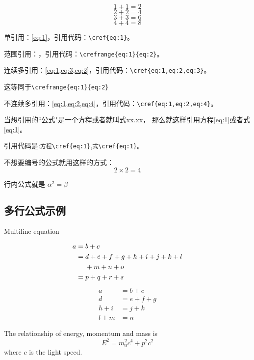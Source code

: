 \begin{equation}
1+1=2 \label{eq:1}
\end{equation}
\begin{equation}
2+2=4 \label{eq:2}
\end{equation}
\begin{equation}
3+3=6 \label{eq:3}
\end{equation}
\begin{equation}
4+4=8 \label{eq:4}
\end{equation}

单引用：\cref{eq:1}，引用代码：\verb|\cref{eq:1}|。

范围引用：，引用代码：\verb|\crefrange{eq:1}{eq:2}|。

连续多引用：\cref{eq:1,eq:3,eq:2}，引用代码：\verb|\cref{eq:1,eq:2,eq:3}|。

这等同于\verb|\crefrange{eq:1}{eq:2}|

不连续多引用：\cref{eq:1,eq:2,eq:4}，引用代码：\verb|\cref{eq:1,eq:2,eq:4}|。



当想引用的``公式"是一个方程或者就叫式xx.xx，
那么就这样引用方程\cref{eq:1}或者式\cref{eq:1}。

引用代码是:\verb|方程\cref{eq:1}|,\verb|式\cref{eq:1}|。

不想要编号的公式就用这样的方式：
 \[ 2\times 2=4 \]

 行内公式就是  $ \alpha ^2= \beta $

\subsection{多行公式示例}{Multiline equation}

\begin{align}
a ={} & b + c \\
={} & d + e + f + g + h + i
+ j + k + l \notag \\
& + m + n + o \\
={} & p + q + r + s
\end{align}
\begin{equation}
\begin{aligned}
a &= b + c \\
d &= e + f + g \\
h + i &= j + k \\
l + m &= n
\end{aligned} \label{eq:5}
\end{equation}

\begin{theory}
The relationship of energy,
momentum and mass is
\[E^2 = m_0^2 c^4 + p^2 c^2\]
where $c$ is the light speed.
\end{theory}


